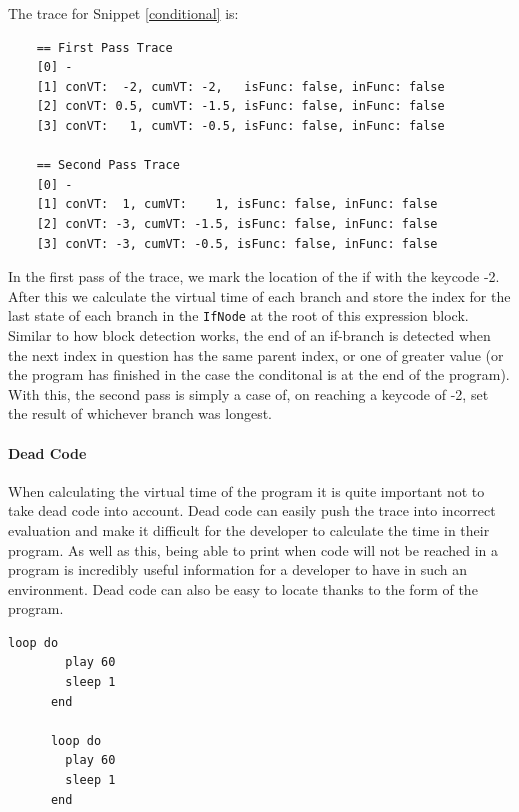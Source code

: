 \documentclass[11pt, abstracton, twoside, titlepage=true]{scrartcl}
\begin{document}
The trace for Snippet \ref{conditional} is:
\\
\begin{lstlisting}
    == First Pass Trace
    [0] -
    [1] conVT:  -2, cumVT: -2,   isFunc: false, inFunc: false
    [2] conVT: 0.5, cumVT: -1.5, isFunc: false, inFunc: false
    [3] conVT:   1, cumVT: -0.5, isFunc: false, inFunc: false

    == Second Pass Trace
    [0] -
    [1] conVT:  1, cumVT:    1, isFunc: false, inFunc: false
    [2] conVT: -3, cumVT: -1.5, isFunc: false, inFunc: false
    [3] conVT: -3, cumVT: -0.5, isFunc: false, inFunc: false
\end{lstlisting}

In the first pass of the trace, we mark the location of the if with the keycode 
-2. After this we calculate the virtual time of each branch and store the index 
for the last state of each branch in the \texttt{IfNode} at the root of this 
expression block. Similar to how block detection works, the end of an if-branch 
is detected when the next index in question has the same parent index, or one 
of greater value (or the program has finished in the case the conditonal is at 
the end of the program). With this, the second pass is simply a case of, on reaching 
a keycode of -2, set the result of whichever branch was longest.

\paragraph{Dead Code}

When calculating the virtual time of the program it is quite important not to 
take dead code into account. Dead code can easily push the trace into incorrect 
evaluation and make it difficult for the developer to calculate the time in their 
program. As well as this, being able to print when code will not be reached in a 
program is incredibly useful information for a developer to have in such an 
environment. Dead code can also be easy to locate thanks to the form of the program.

\begin{minipage}{\textwidth}
	\begin{lstlisting}[style = sonicpi]
      loop do
        play 60
        sleep 1
      end

      loop do
        play 60
        sleep 1
      end
	\end{lstlisting}
	 \label{dead}
\end{minipage}
\end{document}
